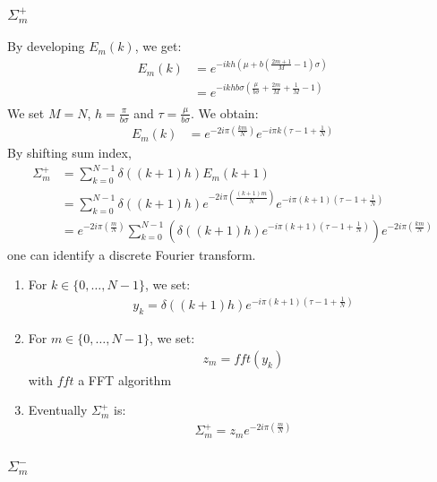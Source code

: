 \subsubsection{$\Sigma_{m}^{+}$}
By developing $E_m(k)$, we get:
\begin{align*}
E_{m}(k)&=e^{-ikh\left(\mu+b\left(\frac{2m+1}{M}-1\right)\sigma\right)}\\
&=e^{-ikhb\sigma\left(\frac{\mu}{b\sigma}+\frac{2m}{M}+\frac{1}{M}-1\right)}\\
\end{align*}
We set $M=N$, $h=\frac{\pi}{b\sigma}$ and $\tau=\frac{\mu}{b\sigma}$. We obtain:
\begin{align*}
E_{m}(k)&=e^{-2i\pi\left(\frac{k m}{N}\right)}e^{-i\pi k\left(\tau-1+\frac{1}{N}\right)}
\end{align*}
By shifting sum index,
\begin{align*}
\Sigma_{m}^{+}&=\sum_{k=0}^{N-1}\delta((k+1)h)E_{m}(k+1)\\
  &=\sum_{k=0}^{N-1}\delta((k+1)h) e^{-2i\pi\left(\frac{(k+1) m}{N}\right)} e^{-i\pi (k+1)\left(\tau-1+\frac{1}{N}\right)}\\
  &=e^{-2i\pi\left(\frac{m}{N}\right)} \sum_{k=0}^{N-1}\left(\delta((k+1)h) e^{-i\pi (k+1)\left(\tau-1+\frac{1}{N}\right)}\right) e^{-2i\pi\left(\frac{k m}{N}\right)} 
\end{align*}
one can identify a discrete Fourier transform.

\begin{enumerate}
\item For $k\in\{0,\hdots,N-1\}$, we set:
\begin{align}
y_{k}=\delta((k+1)h)e^{-i\pi (k+1)\left(\tau-1+\frac{1}{N}\right)}
\end{align}
\item For $m \in\{0,\hdots,N-1\}$, we set:
\begin{align}
  z_{m}=fft(y_{k})
\end{align}
with $fft$ a FFT algorithm
\item Eventually $\Sigma_{m}^{+}$ is:
\begin{align*}
  \Sigma_{m}^{+}=z_{m}e^{-2i\pi\left(\frac{m}{N}\right)}
\end{align*}
\end{enumerate}

\subsubsection{$\Sigma_{m}^{-}$}

